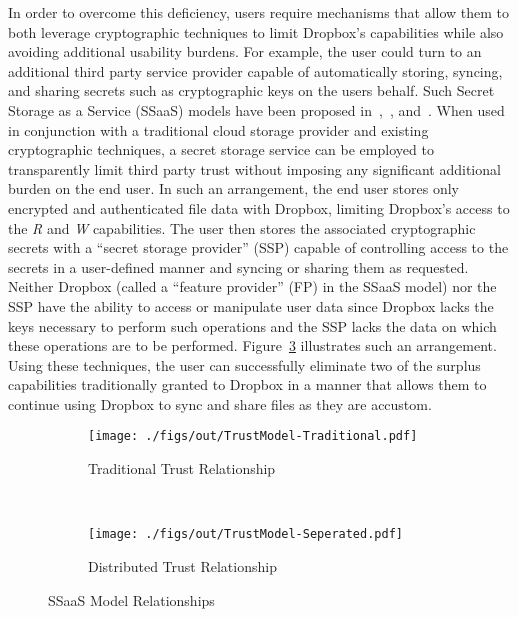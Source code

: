 In order to overcome this deficiency, users require mechanisms that
allow them to both leverage cryptographic techniques to limit
Dropbox's capabilities while also avoiding additional usability
burdens. For example, the user could turn to an additional third party
service provider capable of automatically storing, syncing, and
sharing secrets such as cryptographic keys on the users behalf. Such
Secret Storage as a Service (SSaaS) models have been proposed
in~\cite{sayler-phd},~\cite{tutamen-socc},
and~\cite{custos-trios}. When used in conjunction with a traditional
cloud storage provider and existing cryptographic techniques, a secret
storage service can be employed to transparently limit third party
trust without imposing any significant additional burden on the end
user. In such an arrangement, the end user stores only encrypted and
authenticated file data with Dropbox, limiting Dropbox's access to the
\emph{R} and \emph{W} capabilities. The user then stores the
associated cryptographic secrets with a ``secret storage provider''
(SSP) capable of controlling access to the secrets in a user-defined
manner and syncing or sharing them as requested. Neither Dropbox
(called a ``feature provider'' (FP) in the SSaaS model) nor the SSP
have the ability to access or manipulate user data since Dropbox lacks
the keys necessary to perform such operations and the SSP lacks the
data on which these operations are to be
performed. Figure~\ref{fig:mitigation:trust} illustrates such an
arrangement. Using these techniques, the user can successfully
eliminate two of the surplus capabilities traditionally granted to
Dropbox in a manner that allows them to continue using Dropbox to sync
and share files as they are accustom.

\begin{figure}[t]
  \centering
  \begin{subfigure}[t]{0.48\textwidth}
    \centering
    \texttt{[image: ./figs/out/TrustModel-Traditional.pdf]}
    \caption{Traditional Trust Relationship}
    \label{fig:mitigation:trust:traditional}
  \end{subfigure}
  ~
  \begin{subfigure}[t]{0.48\textwidth}
    \centering
    \texttt{[image: ./figs/out/TrustModel-Seperated.pdf]}
    \caption{Distributed Trust Relationship}
    \label{fig:mitigation:trust:distributed}
  \end{subfigure}
  \caption{SSaaS Model Relationships}
  \label{fig:mitigation:trust}
\end{figure}

